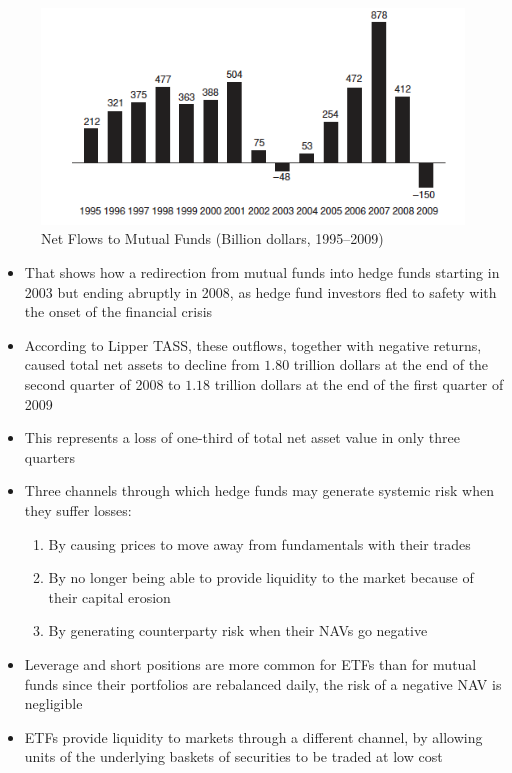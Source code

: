 \documentclass[11pt]{beamer}
\begin{document}
\begin{frame}
\begin{figure}
\includegraphics[width=\textwidth]{12_3.png}
\caption{Net Flows to Mutual Funds (Billion dollars, 1995–2009)}
\end{figure}
\end{frame}

\begin{frame}
\begin{itemize}
\item That shows how a redirection from mutual funds into hedge funds starting in 2003 but ending abruptly in 2008, as hedge fund investors fled to safety with the onset of the financial crisis
\item According to Lipper TASS, these outflows, together with
negative returns, caused total net assets to decline from $1.80$ trillion dollars at the end of the second quarter of 2008 to $1.18$ trillion dollars at the end of the first quarter of 2009
\item This represents a loss of one-third of total net asset value
in only three quarters
\end{itemize}
\end{frame}

\begin{frame}
\begin{itemize}
\item Three channels through which hedge funds may generate systemic risk when they suffer losses:
\begin{enumerate}
\item By causing prices to move away from fundamentals with their trades
\item By no longer being able to provide liquidity to the market because of their capital erosion
\item By generating counterparty risk when their NAVs go negative
\end{enumerate}
\item Leverage and short positions are more common for ETFs than
for mutual funds since their portfolios are rebalanced daily, the risk of a negative NAV is negligible
\item ETFs provide liquidity to markets through a different channel, by allowing units of the underlying baskets of securities to be traded at low cost
\end{itemize}
\end{frame}
\end{document}
